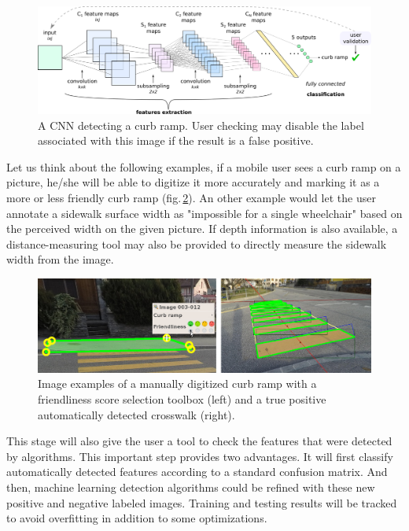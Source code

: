 \documentclass[10pt,conference,a4paper]{IEEEtran}
\begin{document}
\begin{figure}[ht]
\begin{center}
\includegraphics[width=1.0\linewidth]{architecture.png}
\end{center}
   \caption{A CNN detecting a curb ramp. User checking may disable the label associated with this image if the result is a false positive.}\label{cnn}
\end{figure}


Let us think about the following examples, if a mobile user sees a curb ramp on a picture, he/she will be able to digitize it more accurately and marking it as a more or less friendly curb ramp (fig.\,\ref{curbramppicture}). An other example would let the user annotate a sidewalk surface width as %
"impossible for a single wheelchair" based on the perceived width on the given picture. If depth information is also available, 
a distance-measuring tool may also be provided to directly measure the sidewalk width from the image.



\begin{figure}[ht]
\begin{center}
\includegraphics[width=1.0\linewidth]{curb_ramp_crosswalk01.jpg}
\end{center}
   \caption{Image examples of a manually digitized curb ramp with a friendliness score selection toolbox (left) and a true positive automatically detected crosswalk (right).}\label{curbramppicture}
\end{figure}


This stage will also give the user a tool to check the features that were detected by algorithms. This important step provides two advantages. It will first classify automatically detected features according to a standard confusion matrix. And then, machine learning detection algorithms could be refined with these new positive and negative labeled images. Training and testing results will be tracked to avoid overfitting in addition to some optimizations.
\end{document}
